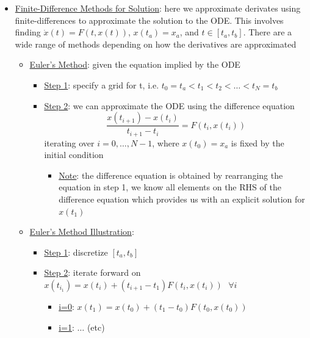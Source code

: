 \documentclass{article}
\begin{document}
\begin{itemize}
\begin{itemize}
\begin{itemize}
\begin{center}
            \end{center}
        \end{itemize}
    \end{itemize}
    \item  \underline{Finite-Difference Methods for Solution}: here we approximate derivates using finite-differences to approximate the solution to the ODE. This involves finding $\dot{x}(t) = F(t,x(t))$, $x(t_{a}) = x_{a}$, and $t \in [t_{a}, t_{b}]$. There are a wide range of methods depending on how the derivatives are approximated
    \begin{itemize}
        \item  \underline{Euler's Method}: given the equation implied by the ODE
        \begin{itemize}
            \item  \underline{Step 1}: specify a grid for t, i.e. $t_{0} = t_{a} < t_{1} < t_{2} < \dots < t_{N} = t_{b}$
            \item  \underline{Step 2}: we can approximate the ODE using the difference equation $$\frac{x(t_{i+1}) - x(t_{i})}{t_{i+1}-t_{i}} = F(t_{i},x(t_{i}))$$ iterating over $i = 0, \dots, N-1$, where $x(t_{0})=x_{a}$ is fixed by the initial condition
                \begin{itemize}
                    \item  \underline{Note}: the difference equation is obtained by rearranging the equation in step 1, we know all elements on the RHS of the difference equation which provides us with an explicit solution for $x(t_{1})$
                \end{itemize}
        \end{itemize}
        \item  \underline{Euler's Method Illustration}:
        \begin{itemize}
            \item  \underline{Step 1}: discretize $[t_{a}, t_{b}]$
            \item  \underline{Step 2}: iterate forward on $x(t_{i_1}) = x(t_{i}) + (t_{i+1} - t_{1})F(t_{i}, x(t_{i})) \ \ \ \forall i$
            \begin{itemize}
                \item \underline{i=0}: $x(t_{1}) = x(t_{0}) + (t_{1} - t_{0})F(t_{0}, x(t_{0}))$
                \item  \underline{i=1}: $\dots$ (etc)
            \end{itemize}
        \end{itemize}

\end{itemize}
\end{itemize}
\end{document}
